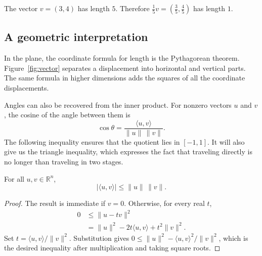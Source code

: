 \documentclass{hubbardbook}
\newcommand{\R}{\mathbb{R}}
\newcommand{\norm}[1]{\lVert #1\rVert}
\newcommand{\inner}[2]{\langle #1,#2\rangle}
\begin{document}
\begin{example}
The vector \(v=(3,4)\) has length \(5\). Therefore
\(\frac15v=(\frac35,\frac45)\) has length \(1\).
\end{example}

\clearpage
\subsection{A geometric interpretation}
\begin{marginfigure}
\centering
{}
\caption{The vector \(v=(4,3)\) and its coordinate displacements.}
\label{fig:vector}
\end{marginfigure}
In the plane, the coordinate formula for length is the Pythagorean
theorem. Figure~\ref{fig:vector} separates a displacement into horizontal
and vertical parts. The same formula in higher dimensions adds the squares
of all the coordinate displacements.

Angles can also be recovered from the inner product. For nonzero vectors
\(u\) and \(v\), the cosine of the angle between them is
\begin{equation}\label{eq:angle}
  \cos\theta=\frac{\inner{u}{v}}{\norm{u}\,\norm{v}}.
\end{equation}
The following inequality ensures that the quotient lies in \([-1,1]\).
It will also give us the triangle inequality, which expresses the fact
that traveling directly is no longer than traveling in two stages.

\begin{theorem}\label{thm:cs}
For all \(u,v\in\R^n\),
\begin{equation}\label{eq:cs}
  |\inner{u}{v}|\leq\norm{u}\,\norm{v}.
\end{equation}
\end{theorem}
\begin{proof}
The result is immediate if \(v=0\). Otherwise, for every real \(t\),
\begin{align*}
  0&\leq\norm{u-tv}^2\\
   &=\norm{u}^2-2t\inner{u}{v}+t^2\norm{v}^2.
\end{align*}
Set \(t=\inner{u}{v}/\norm{v}^2\). Substitution gives
\(0\leq\norm{u}^2-\inner{u}{v}^2/\norm{v}^2\), which is the desired
inequality after multiplication and taking square roots.
\end{proof}
\end{document}
